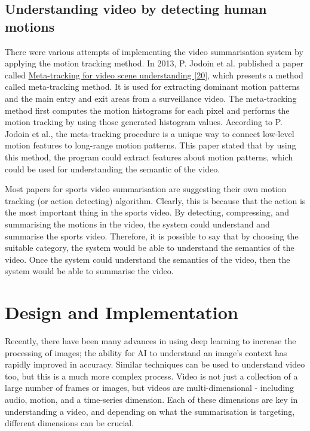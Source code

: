 \documentclass{article}
\begin{document}
\subsection{Understanding video by detecting human motions}

There were various attempts of implementing the video summarisation system by applying the motion tracking method. In 2013, P. Jodoin et al. published a paper called \hyperlink{ref20}{Meta-tracking for video scene understanding [20]}, which presents a method called meta-tracking method. It is used for extracting dominant motion patterns and the main entry and exit areas from a surveillance video. The meta-tracking method first computes the motion histograms for each pixel and performs the motion tracking by using those generated histogram values. According to P. Jodoin et al., the meta-tracking procedure is a unique way to connect low-level motion features to long-range motion patterns. This paper stated that by using this method, the program could extract features about motion patterns, which could be used for understanding the semantic of the video.

Most papers for sports video summarisation are suggesting their own motion tracking (or action detecting) algorithm. Clearly, this is because that the action is the most important thing in the sports video. By detecting, compressing, and summarising the motions in the video, the system could understand and summarise the sports video. Therefore, it is possible to say that by choosing the suitable category, the system would be able to understand the semantics of the video. Once the system could understand the semantics of the video, then the system would be able to summarise the video.

\section{Design and Implementation}

Recently, there have been many advances in using deep learning to increase the processing of images; the ability for AI to understand an image’s context has rapidly improved in accuracy. Similar techniques can be used to understand video too, but this is a much more complex process. Video is not just a collection of a large number of frames or images, but videos are multi-dimensional - including audio, motion, and a time-series dimension. Each of these dimensions are key in understanding a video, and depending on what the summarisation is targeting, different dimensions can be crucial.
\end{document}
